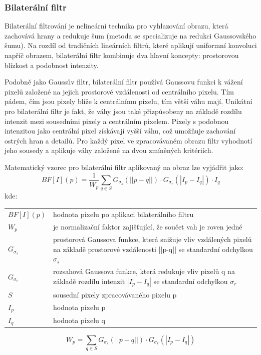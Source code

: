 \documentclass[male,czech,api_ing]{thesis}
\makeatletter
\newenvironment{conditions}[1][kde:]
    {#1 \begin{tabular}[t]{>{$}l<{$} @{${}={}$} >{\raggedright\arraybackslash}p{10cm}}}
    {\end{tabular}}
\makeatother
\begin{document}
\subsubsection{Bilaterální filtr}
Bilaterální filtrování je nelineární technika pro vyhlazování obrazu, která zachovává hrany a redukuje šum (metoda se specializuje na redukci Gaussovského šumu). Na rozdíl od tradičních lineárních filtrů, které aplikují uniformní konvoluci napříč obrazem, bilaterální filtr kombinuje dva hlavní koncepty: prostorovou blízkost a podobnost intenzity. 

Podobně jako Gaussův filtr, bilaterální filtr používá Gaussovu funkci k vážení pixelů založené na jejich prostorové vzdálenosti od centrálního pixelu. Tím pádem, čím jsou pixely blíže k centrálnímu pixelu, tím větší váhu mají. Unikátní pro bilaterální filtr je fakt, že váhy jsou také přizpůsobeny na základě rozdílu intenzit mezi sousedními pixely a centrálním pixelem. Pixely s podobnou intenzitou jako centrální pixel získávají vyšší váhu, což umožňuje zachování ostrých hran a detailů. Pro každý pixel ve zpracovávaném obrazu filtr vyhodnotí jeho sousedy a aplikuje váhy založené na dvou zmíněných kritériích. \cite{BilateralFilter}

Matematický vzorec pro bilaterální filtr aplikovaný na obraz lze vyjádřit jako:
\begin{equation}
    BF[I](p) = \frac{1}{W_p} \sum_{q \in S} G_{\sigma_s}(||p-q||) \cdot G_{\sigma_r}(|I_p - I_q|) \cdot I_q
\end{equation}
\begin{conditions}
    BF[I](p) & hodnota pixelu po aplikaci bilaterálního filtru \\
    W_p & je normalizační faktor zajišťující, že součet vah je roven jedné \\
    G_{\sigma_s} & prostorová Gaussova funkce, která snižuje vliv vzdálených pixelů na základě prostorové vzdálenosti ||p-q|| se standardní odchylkou $\sigma_s$ \\
    G_{\sigma_r} & rozsahová Gaussova funkce, která redukuje vliv pixelů q na základě rozdílu intenzit $|I_p-I_q|$ se standardní odchylkou $\sigma_r$ \\
    S & sousední pixely zpracovávaného pixelu p \\
    I_p & hodnota pixelu p \\
    I_q & hodnota pixelu q \\
\end{conditions}

\begin{equation}
    W_p = \sum_{q \in S} G_{\sigma_s}(||p-q||) \cdot G_{\sigma_r}(|I_p - I_q|)
\end{equation}
\end{document}
